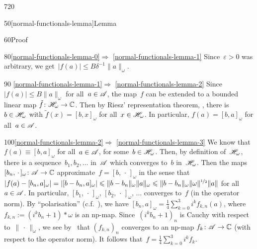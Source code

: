 \begin{parsec}{720}
\begin{point}{50}[normal-functionals-lemma]{Lemma}
\begin{point}{60}{Proof}
\begin{point}{80}{\ref{normal-functionals-lemma-0}$\Longrightarrow$%
\ref{normal-functionals-lemma-1}}
Since~$\varepsilon>0$ was arbitrary, we get~$\left|f(a)\right|\leq
B\delta^{-1}\|a\|_\omega$.
\end{point}
\begin{point}{90}{%
\ref{normal-functionals-lemma-1}$\Longrightarrow$%
\ref{normal-functionals-lemma-2}}%
Since~$\left|f(a)\right|\leq B\|a\|_\omega$ for all~$a\in\scrA$,
the map~$f$ can be extended to a bounded linear map 
$\tilde{f}\colon \scrH_\omega\to \C$.
Then by Riesz' representation theorem, ,
there is~$b\in \scrH_\omega$ with $\tilde{f}(x)=[b,x]_\omega$
for all~$x\in \scrH_\omega$.  
In particular,
$f(a)=[b,a]_\omega$ for all~$a\in \scrA$.
\end{point}
\begin{point}{100}{\ref{normal-functionals-lemma-2}$\Longrightarrow$%
\ref{normal-functionals-lemma-3}}%
We know that~$f(a)\equiv [b,a]_\omega$ for all~$a\in \scrA$,
for some~$b\in\scrH_\omega$.
Then, by definition of~$\scrH_\omega$,
there is a sequence~$b_1,b_2,\dotsc$ in~$\scrA$
which converges to~$b$ in~$\scrH_\omega$.
Then the maps $[b_n,\,\cdot\,]_\omega\colon \scrA\to \C$
approximate~$f=[b,\,\cdot\,]_\omega$
in the sense that 
$\left|f(a)-[b_n,a]_\omega\right|=\left|[b-b_n,a]_\omega\right|
\leq \|b-b_n\|_\omega \|a\|_\omega
	\leq \|b-b_n\|_\omega \|\omega\|^{\nicefrac{1}{2}} \|a\|$
for all~$a\in \scrA$.
In particular, $[b_1,\,\cdot\,]_\omega,\,[b_2,\,\cdot\,]_\omega,\,\dotsc$
converges to~$f$ (in the operator norm).
By ``polarisation'' (c.f.~),
we have $[b_n,a]_\omega = \frac{1}{4}\sum_{k=0}^3 i^kf_{k,n}(a)$,
where $f_{k,n} := (i^kb_n+1)*\omega$ is an np-map.
Since~$(i^kb_n+1)_n$ is Cauchy with respect to~$\|\,\cdot\,\|_\omega$,
we see by~ that 
$(f_{k,n})_n$ converges to an np-map $f_k\colon \scrA\to\C$
(with respect to the operator norm).
It follows that~$f=\frac{1}{4}\sum_{k=0}^3 i^k f_k$.


\end{point}
\end{point}
\end{point}
\end{parsec}
